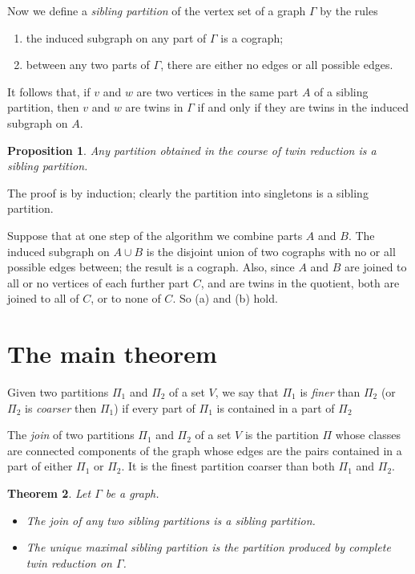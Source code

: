 \documentclass[12pt]{article}
\newtheorem{theorem}{Theorem}[section]
\newtheorem{prop}[theorem]{Proposition}
\newenvironment{proof}{\prepf\rm}{\endprepf}
\begin{document}
Now we define a \emph{sibling partition} of the vertex set of a graph $\Gamma$
by the rules
\begin{enumerate}
\item the induced subgraph on any part of $\Gamma$ is a cograph;
\item between any two parts of $\Gamma$, there are either no edges or all
possible edges.
\end{enumerate}

It follows that, if $v$ and $w$ are two vertices in the same part $A$ of a
sibling partition, then $v$ and $w$ are twins in $\Gamma$ if and only if they
are twins in the induced subgraph on $A$.

\begin{prop}
Any partition obtained in the course of twin reduction is a sibling partition.
\end{prop}

\begin{proof}
The proof is by induction; clearly the partition into singletons is a sibling
partition.

Suppose that at one step of the algorithm we combine parts $A$ and $B$. The
induced subgraph on $A\cup B$ is the disjoint union of two cographs with no or
all possible edges between; the result is a cograph. Also, since $A$ and $B$
are joined to all or no vertices of each further part $C$, and are twins in the
quotient, both are joined to all of $C$, or to none of $C$. So (a) and (b) hold.
\end{proof}

\section{The main theorem}

Given two partitions $\Pi_1$ and $\Pi_2$ of a set $V$, we say that
$\Pi_1$ is \emph{finer} than $\Pi_2$ (or $\Pi_2$ is \emph{coarser} then
$\Pi_1$) if every part of $\Pi_1$ is contained in a part of $\Pi_2$

The \emph{join} of two partitions $\Pi_1$ and $\Pi_2$ of a set $V$ is the
partition $\Pi$ whose classes are connected components of the graph whose
edges are the pairs contained in a part of either $\Pi_1$ or $\Pi_2$. It is
the finest partition coarser than both $\Pi_1$ and $\Pi_2$.

\begin{theorem}
Let $\Gamma$ be a graph.
\begin{itemize}
\item[(i)] The join of any two sibling partitions is a sibling partition.
\item[(ii)] The unique maximal sibling partition is the partition produced by
complete twin reduction on $\Gamma$.
\end{itemize}
\end{theorem}
\end{document}
